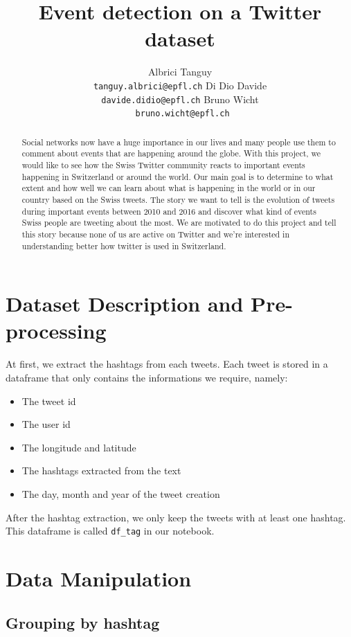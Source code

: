 \documentclass[11pt]{article}
\title{Event detection on a Twitter dataset}
\author{ 
  Albrici Tanguy \hspace{40px} \\
  {\tt tanguy.albrici@epfl.ch} \hspace{40px} \And
  Di Dio Davide \\
  {\tt davide.didio@epfl.ch} \And
   \hspace{40px} Bruno Wicht \\
{\tt \hspace{40px} bruno.wicht@epfl.ch} \\}
\date{}
\begin{document}
\maketitle
\begin{abstract}
  Social networks now have a huge importance in our lives and many people use them to comment about events that are happening around the globe. With this project, we would like to see how the Swiss Twitter community reacts to important events happening in Switzerland or around the world. Our main goal is to determine to what extent and how well we can learn about what is happening in the world or in our country based on the Swiss tweets. The story we want to tell is the evolution of tweets during important events between 2010 and 2016 and discover what kind of events Swiss people are tweeting about the most. We are motivated to do this project and tell this story because none of us are active on Twitter and we're interested in understanding better how twitter is used in Switzerland.
\end{abstract}


\section{Dataset Description and Pre-processing}

At first, we extract the hashtags from each tweets. Each tweet is stored in a dataframe that only contains the informations we require, namely: 
\begin{itemize}

\item The tweet id 
\item The user id
\item The longitude and latitude
\item The hashtags extracted from the text
\item The day, month and year of the tweet creation

\end{itemize}

After the hashtag extraction, we only keep the tweets with at least one hashtag. This dataframe is called \texttt{df\_tag} in our notebook.

\section{Data Manipulation}


\subsection{Grouping by hashtag}
\end{document}
